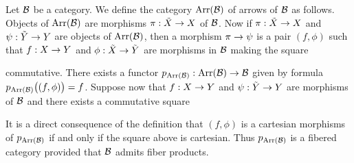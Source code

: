\begin{example}\label{example:the_fibered_category_of_arrows}
Let ${\mathcal B}$ be a category. We define the category $\mathrm{Arr}({\mathcal B})$ of arrows of ${\mathcal B}$ as follows. Objects of $\mathrm{Arr}({\mathcal B})$ are morphisms $\pi:\tilde{X}\rightarrow X$ of ${\mathcal B}$. Now if $\pi:\tilde{X}\rightarrow X$ and $\psi:\tilde{Y}\rightarrow Y$ are objects of $\mathrm{Arr}({\mathcal B})$, then a morphism $\pi\rightarrow \psi$ is a pair $(f,\phi)$ such that $f:X\rightarrow Y$ and $\phi:\tilde{X}\rightarrow \tilde{Y}$ are morphisms in ${\mathcal B}$ making the square
\begin{center}
\end{center}
commutative. There exists a functor $p_{\mathrm{Arr}({\mathcal B})}:\mathrm{Arr}({\mathcal B})\rightarrow {\mathcal B}$ given by formula $p_{\mathrm{Arr}({\mathcal B})}\big((f,\phi)\big) = f$. Suppose now that $f:X\rightarrow Y$ and $\psi:\tilde{Y}\rightarrow Y$ are morphisms of ${\mathcal B}$ and there exists a commutative square
\begin{center}
\end{center}
It is a direct consequence of the definition that $(f,\phi)$ is a cartesian morphisms of $p_{\mathrm{Arr}({\mathcal B})}$ if and only if the square above is cartesian. Thus $p_{\mathrm{Arr}({\mathcal B})}$ is a fibered category provided that ${\mathcal B}$ admits fiber products.
\end{example}

